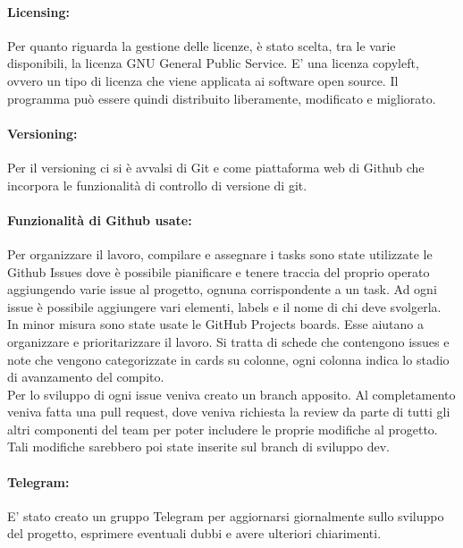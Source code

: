     \paragraph{Licensing: } Per quanto riguarda la gestione delle licenze, è stato scelta, tra le varie disponibili, la licenza GNU General Public Service. E' una licenza copyleft, ovvero un tipo di licenza che viene applicata ai software open source. Il programma può essere quindi distribuito liberamente, modificato e migliorato.
    
    \paragraph{Versioning: }
    Per il versioning ci si è avvalsi di Git e come piattaforma web di Github che incorpora le funzionalità di controllo di versione di git.
    
    \paragraph{Funzionalità di Github usate: }
    Per organizzare il lavoro, compilare e assegnare i tasks sono state utilizzate le Github Issues dove è possibile pianificare e tenere traccia del proprio operato aggiungendo varie issue al progetto, ognuna corrispondente a un task. Ad ogni issue è possibile aggiungere vari elementi, labels e il nome di chi deve svolgerla.\\ In minor misura sono state usate le GitHub Projects boards. Esse aiutano a organizzare e prioritarizzare il lavoro. Si tratta di schede che contengono issues e note che vengono categorizzate in cards su colonne, ogni colonna indica lo stadio di avanzamento del compito.\\
    Per lo sviluppo di ogni issue veniva creato un branch apposito. Al completamento veniva fatta una pull request, dove veniva richiesta la review da parte di tutti gli altri componenti del team per poter includere le proprie modifiche al progetto. Tali modifiche sarebbero poi state inserite sul branch di sviluppo dev. 
    
    
    
    \paragraph{Telegram: }
    E' stato creato un gruppo Telegram per aggiornarsi giornalmente sullo sviluppo del progetto, esprimere eventuali dubbi e avere ulteriori chiarimenti. 
    
